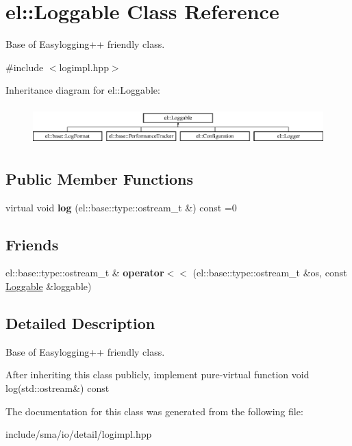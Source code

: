 \hypertarget{classel_1_1Loggable}{\section{el\-:\-:Loggable Class Reference}
\label{classel_1_1Loggable}
}


Base of Easylogging++ friendly class.  




{\ttfamily \#include $<$logimpl.\-hpp$>$}

Inheritance diagram for el\-:\-:Loggable\-:\begin{figure}[H]
\begin{center}
\leavevmode
\includegraphics[height=1.505376cm]{classel_1_1Loggable}
\end{center}
\end{figure}
\subsection*{Public Member Functions}
\begin{DoxyCompactItemize}
\item 
\hypertarget{classel_1_1Loggable_ad8a2e0ebc11e4bd00ef49fc67db3d59e}{virtual void {\bfseries log} (el\-::base\-::type\-::ostream\-\_\-t \&) const =0}\label{classel_1_1Loggable_ad8a2e0ebc11e4bd00ef49fc67db3d59e}

\end{DoxyCompactItemize}
\subsection*{Friends}
\begin{DoxyCompactItemize}
\item 
\hypertarget{classel_1_1Loggable_a00722a386f498be3ebece2e266fb0f05}{el\-::base\-::type\-::ostream\-\_\-t \& {\bfseries operator$<$$<$} (el\-::base\-::type\-::ostream\-\_\-t \&os, const \hyperlink{classel_1_1Loggable}{Loggable} \&loggable)}\label{classel_1_1Loggable_a00722a386f498be3ebece2e266fb0f05}

\end{DoxyCompactItemize}


\subsection{Detailed Description}
Base of Easylogging++ friendly class. 

After inheriting this class publicly, implement pure-\/virtual function {\ttfamily void log(std\-::ostream\&) const} 

The documentation for this class was generated from the following file\-:\begin{DoxyCompactItemize}
\item 
include/sma/io/detail/logimpl.\-hpp\end{DoxyCompactItemize}

